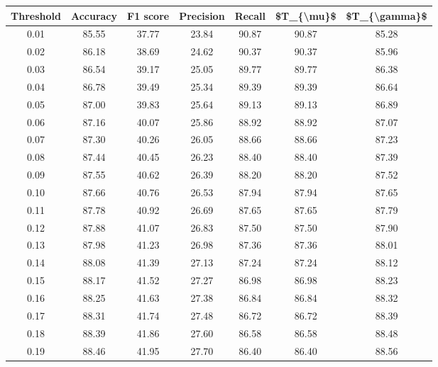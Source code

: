 \begin{tabular}{|c|c|c|c|c|c|c|}
\hline
 Threshold &  Accuracy &  F1 score &  Precision &  Recall &  \$T\_\{\textbackslash mu\}\$ &  \$T\_\{\textbackslash gamma\}\$ \\
\hline
      0.01 &     85.55 &     37.77 &      23.84 &   90.87 &      90.87 &         85.28 \\
      0.02 &     86.18 &     38.69 &      24.62 &   90.37 &      90.37 &         85.96 \\
      0.03 &     86.54 &     39.17 &      25.05 &   89.77 &      89.77 &         86.38 \\
      0.04 &     86.78 &     39.49 &      25.34 &   89.39 &      89.39 &         86.64 \\
      0.05 &     87.00 &     39.83 &      25.64 &   89.13 &      89.13 &         86.89 \\
      0.06 &     87.16 &     40.07 &      25.86 &   88.92 &      88.92 &         87.07 \\
      0.07 &     87.30 &     40.26 &      26.05 &   88.66 &      88.66 &         87.23 \\
      0.08 &     87.44 &     40.45 &      26.23 &   88.40 &      88.40 &         87.39 \\
      0.09 &     87.55 &     40.62 &      26.39 &   88.20 &      88.20 &         87.52 \\
      0.10 &     87.66 &     40.76 &      26.53 &   87.94 &      87.94 &         87.65 \\
      0.11 &     87.78 &     40.92 &      26.69 &   87.65 &      87.65 &         87.79 \\
      0.12 &     87.88 &     41.07 &      26.83 &   87.50 &      87.50 &         87.90 \\
      0.13 &     87.98 &     41.23 &      26.98 &   87.36 &      87.36 &         88.01 \\
      0.14 &     88.08 &     41.39 &      27.13 &   87.24 &      87.24 &         88.12 \\
      0.15 &     88.17 &     41.52 &      27.27 &   86.98 &      86.98 &         88.23 \\
      0.16 &     88.25 &     41.63 &      27.38 &   86.84 &      86.84 &         88.32 \\
      0.17 &     88.31 &     41.74 &      27.48 &   86.72 &      86.72 &         88.39 \\
      0.18 &     88.39 &     41.86 &      27.60 &   86.58 &      86.58 &         88.48 \\
      0.19 &     88.46 &     41.95 &      27.70 &   86.40 &      86.40 &         88.56 \\

\end{tabular}
